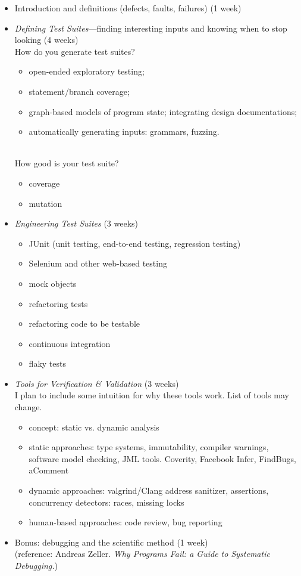 \documentclass{article}
\begin{document}
\begin{itemize}
\item Introduction and definitions (defects, faults, failures) (1 week)
\item \emph{Defining Test Suites}---finding interesting inputs and knowing when to stop looking (4 weeks)\\
How do you generate test suites?
\begin{itemize}
\item open-ended exploratory testing;
\item statement/branch coverage;
\item graph-based models of program state; integrating design documentations; 
\item automatically generating inputs: grammars, fuzzing.
\end{itemize}~\\[-1em]
How good is your test suite?
\begin{itemize}
\item coverage
\item mutation
\end{itemize}

\item \emph{Engineering Test Suites} (3 weeks)
\begin{itemize}
\item JUnit (unit testing, end-to-end testing, regression testing)
\item Selenium and other web-based testing
\item mock objects
\item refactoring tests
\item refactoring code to be testable
\item continuous integration
\item flaky tests
\end{itemize}

\item \emph{Tools for Verification \& Validation} (3 weeks)\\
I plan to include some intuition for why these tools work. List of tools may change.

\begin{itemize}
\item concept: static vs. dynamic analysis
\item static approaches: type systems, immutability, compiler warnings, software model checking, JML tools. Coverity, Facebook Infer, FindBugs, aComment
\item dynamic approaches: valgrind/Clang address sanitizer, assertions, concurrency detectors: races, missing locks
\item human-based approaches: code review, bug reporting
\end{itemize}

\item Bonus: debugging and the scientific method (1 week) \\
(reference: Andreas Zeller. \emph{Why Programs Fail: a Guide to Systematic Debugging.})
\end{itemize}
\end{document}
